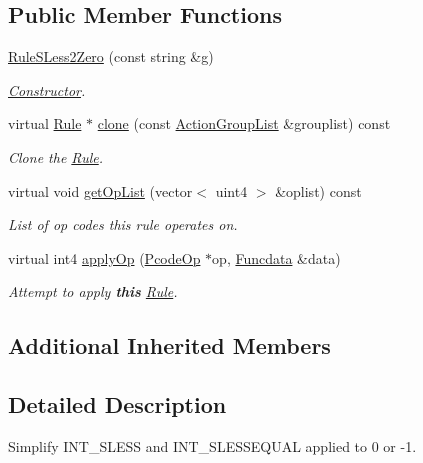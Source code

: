 \subsection*{Public Member Functions}
\begin{DoxyCompactItemize}
\item 
\mbox{\hyperlink{class_rule_s_less2_zero_a3afea061db07773a60bdbb0e74520ace}{Rule\+S\+Less2\+Zero}} (const string \&g)
\begin{DoxyCompactList}\small\item\em \mbox{\hyperlink{class_constructor}{Constructor}}. \end{DoxyCompactList}\item 
virtual \mbox{\hyperlink{class_rule}{Rule}} $\ast$ \mbox{\hyperlink{class_rule_s_less2_zero_a8a7902b27cde82499a427eaf8d0e5dde}{clone}} (const \mbox{\hyperlink{class_action_group_list}{Action\+Group\+List}} \&grouplist) const
\begin{DoxyCompactList}\small\item\em Clone the \mbox{\hyperlink{class_rule}{Rule}}. \end{DoxyCompactList}\item 
virtual void \mbox{\hyperlink{class_rule_s_less2_zero_adaf1c83c1ef17227b4215ea9abea032a}{get\+Op\+List}} (vector$<$ uint4 $>$ \&oplist) const
\begin{DoxyCompactList}\small\item\em List of op codes this rule operates on. \end{DoxyCompactList}\item 
virtual int4 \mbox{\hyperlink{class_rule_s_less2_zero_aee3dc812afcd3baeef9d3995971c098a}{apply\+Op}} (\mbox{\hyperlink{class_pcode_op}{Pcode\+Op}} $\ast$op, \mbox{\hyperlink{class_funcdata}{Funcdata}} \&data)
\begin{DoxyCompactList}\small\item\em Attempt to apply {\bfseries{this}} \mbox{\hyperlink{class_rule}{Rule}}. \end{DoxyCompactList}\end{DoxyCompactItemize}
\subsection*{Additional Inherited Members}


\subsection{Detailed Description}
Simplify I\+N\+T\+\_\+\+S\+L\+E\+SS and I\+N\+T\+\_\+\+S\+L\+E\+S\+S\+E\+Q\+U\+AL applied to 0 or -\/1. 

